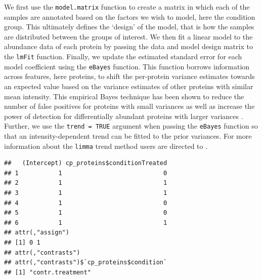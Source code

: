 \documentclass[9pt,a4paper,]{extarticle}
\newenvironment{Shaded}{\begin{snugshade}}{\end{snugshade}}
\newcommand{\DocumentationTok}[1]{\textcolor[rgb]{0.56,0.35,0.01}{\textbf{\textit{#1}}}}
\newcommand{\FunctionTok}[1]{\textcolor[rgb]{0.13,0.29,0.53}{\textbf{#1}}}
\newcommand{\NormalTok}[1]{#1}
\newcommand{\OtherTok}[1]{\textcolor[rgb]{0.56,0.35,0.01}{#1}}
\newcommand{\SpecialCharTok}[1]{\textcolor[rgb]{0.81,0.36,0.00}{\textbf{#1}}}
\begin{document}
We first use the \texttt{model.matrix} function to create a matrix in which each of the
samples are annotated based on the factors we wish to model, here the condition
group. This ultimately defines the `design' of the model, that is how the
samples are distributed between the groups of interest. We then fit a linear
model to the abundance data of each protein by passing the data and model design
matrix to the \texttt{lmFit} function. Finally, we update the estimated standard error
for each model coefficient using the \texttt{eBayes} function. This function borrows
information across features, here proteins, to shift the per-protein variance
estimates towards an expected value based on the variance estimates of other
proteins with similar mean intensity. This empirical Bayes technique has been
shown to reduce the number of false positives for proteins with small variances
as well as increase the power of detection for differentially abundant proteins
with larger variances \citep{Phipson2016}. Further, we use the \texttt{trend\ =\ TRUE} argument
when passing the \texttt{eBayes} function so that an intensity-dependent trend can be
fitted to the prior variances. For more information about the \texttt{limma} trend
method users are directed to \citep{Law2014}.

\begin{Shaded}
\end{Shaded}

\begin{verbatim}
##   (Intercept) cp_proteins$conditionTreated
## 1           1                            0
## 2           1                            1
## 3           1                            1
## 4           1                            0
## 5           1                            0
## 6           1                            1
## attr(,"assign")
## [1] 0 1
## attr(,"contrasts")
## attr(,"contrasts")$`cp_proteins$condition`
## [1] "contr.treatment"
\end{verbatim}
\end{document}
